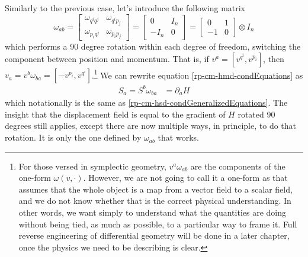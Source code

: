 Similarly to the previous case, let's introduce the following matrix
\begin{equation}\label{rp-cm-hmd-symplecticForm}
	\tag{SF-N}
	\omega_{ab} = \left[\begin{array}{cc}
		\omega_{q^i q^j} & \omega_{q^i p_j} \\
		\omega_{p_i q^j} & \omega_{p_i p_j} 
	\end{array} \right]= \left[\begin{array}{cc}
		0 & I_n \\
		- I_n & 0 
	\end{array} \right] = \left[\begin{array}{cc}
	0 & 1 \\
	-1 & 0 
\end{array} \right] \otimes I_n
\end{equation}
which performs a 90 degree rotation within each degree of freedom, switching the component between position and momentum. That is, if $v^a = [v^{q^i}, v^{p_i}]$, then $v_a = v^b \omega_{ba}  = [-v^{p_i}, v^{q^i}]$.\footnote{For those versed in symplectic geometry, $v^a \omega_{ab}$ are the components of the one-form $\omega(v, \cdot)$. However, we are not going to call it a one-form as that assumes that the whole object is a map from a vector field to a scalar field, and we do not know whether that is the correct physical understanding. In other words, we want simply to understand what the quantities are doing without being tied, as much as possible, to a particular way to frame it. Full reverse engineering of differential geometry will be done in a later chapter, once the physics we need to be describing is clear.} We can rewrite equation \ref{rp-cm-hmd-condEquations} as
\begin{equation}\label{rp-hm-HamiltonSymp}
	\begin{aligned}
		S_a = S^b \omega_{ba}  &= \partial_a H 
	\end{aligned}
\end{equation}
which notationally is the same as \ref{rp-cm-hsd-condGeneralizedEquations}. The insight that the displacement field is equal to the gradient of $H$ rotated 90 degrees still applies, except there are now multiple ways, in principle, to do that rotation. It is only the one defined by $\omega_{ab}$ that works.

